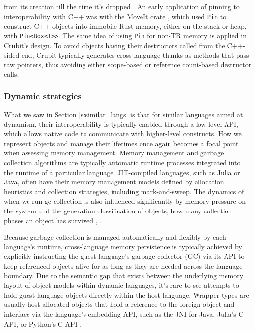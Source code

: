 from its creation till the time it's dropped \cite{rust-pinning}. An early application of pinning to interoperability with C++ was with the MoveIt crate \cite{Young2023google}, which used \texttt{Pin} to construct C++ objects into immobile Rust memory, either on the stack or heap, with \texttt{Pin<Box<T>>}. The same idea of using \texttt{Pin} for non-TR memory is applied in Crubit's design. To avoid objects having their destructors called from the C++-sided end, Crubit typically generates cross-language thunks as methods that pass raw pointers, thus avoiding either scope-based or reference count-based destructor calls. 

\subsubsection{Dynamic strategies}\label{s:dynamic_strategies}

What we saw in Section \ref{s:similar_langs} is that for similar languages aimed at dynamism, their interoperability is typically enabled through a low-level API, which allows native code to communicate with higher-level constructs. How we represent objects and manage their lifetimes once again becomes a focal point when assessing memory management. Memory management and garbage collection algorithms are typically automatic runtime processes integrated into the runtime of a particular language. JIT-compiled languages, such as Julia or Java, often have their memory management models defined by allocation heuristics and collection strategies, including mark-and-sweep. The dynamics of when we run gc-collection is also influenced significantly by memory pressure on the system and the generation classification of objects,  \ie how many collection phases an object has survived \cite{juliacall-gc}, \cite{digitalocean-jvm-memory-2020}. 

Because garbage collection is managed automatically and flexibly by each language's runtime, cross-language memory persistence is typically achieved by explicitly instructing the guest language's garbage collector (GC) via its API to keep referenced objects alive for as long as they are needed across the language boundary. Due to the semantic gap that exists between the underlying memory layout of object models within dynamic languages, it's rare to see attempts to hold guest-language objects directly within the host language. Wrapper types are usually host-allocated objects that hold a reference to the foreign object and interface via the language's embedding API, such as the JNI for Java, Julia's C-API, or Python's C-API \cite{Sengupta2023JuliaInterop}.  

